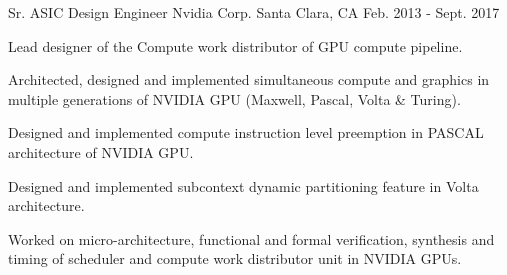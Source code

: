 \begin{cventries}
  \cventry
    {Sr. ASIC Design Engineer} %
    {Nvidia Corp.} %
    {Santa Clara, CA} %
    {Feb. 2013 - Sept. 2017} %
    {
      \begin{cvitems} %
        \item {Lead designer of the Compute work distributor of GPU compute pipeline.}
        \item {Architected, designed and implemented simultaneous compute and graphics in multiple generations of NVIDIA GPU (Maxwell, Pascal, Volta \& Turing).}
        \item {Designed and implemented compute instruction level preemption in PASCAL architecture of NVIDIA GPU.}
        \item {Designed and implemented subcontext dynamic partitioning feature in Volta architecture.}
        \item {Worked on micro-architecture, functional and formal verification, synthesis and timing of scheduler and compute work distributor unit in NVIDIA GPUs.}
      \end{cvitems}
    }
\end{cventries}
